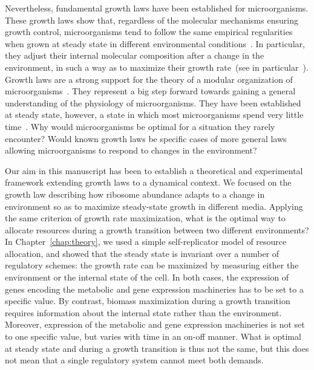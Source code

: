 Nevertheless, fundamental growth laws have been established for microorganisms.
These growth laws show that, regardless of the molecular mechanisms ensuring growth control, microorganisms tend to follow the same empirical regularities when grown at steady state in different environmental conditions~\cite{molenaar_shifts_2009,scott_emergence_2014,scott_interdependence_2010,scott_bacterial_2011}.
In particular, they adjust their internal molecular composition after a change in the environment, in such a way as to maximize their growth rate~(see in particular~\cite{molenaar_shifts_2009,scott_emergence_2014}).
Growth laws are a strong support for the theory of a modular organization of microorganisms~\cite{scott_emergence_2014,hartwell_molecular_1999,arkin_fast_2006,guido_bottom-up_2006}.
They represent a big step forward towards gaining a general understanding of the physiology of microorganisms.
They have been established at steady state, however, a state in which most microorganisms spend very little time~\cite{mcarthur_microbial_2006,menge_nitrogen_2012,
hobbie_microbes_2013,savageau_escherichia_1983,
savageau_demand_1998,blount_unexhausted_2015,vanelsas_survival_2011}.
Why would microorganisms be optimal for a situation they rarely encounter?
Would known growth laws be specific cases of more general laws allowing microorganisms to respond to changes in the environment?

Our aim in this manuscript has been to establish a theoretical and experimental framework extending growth laws to a dynamical context.
We focused on the growth law describing how ribosome abundance adapts to a change in environment so as to maximize steady-state growth in different media.
Applying the same criterion of growth rate maximization, what is the optimal way to allocate resources during a growth transition between two different environments?
In Chapter~\ref{chap:theory}, we used a simple self-replicator model of resource allocation, and showed that the steady state is invariant over a number of regulatory schemes: the growth rate can be maximized by measuring either the environment or the internal state of the cell.
In both cases, the expression of genes encoding the metabolic and gene expression machineries has to be set to a specific value.
By contrast, biomass maximization during a growth transition requires information about the internal state rather than the environment.
Moreover, expression of the metabolic and gene expression machineries is not set to one specific value, but varies with time in an on-off manner.
What is optimal at steady state and during a growth transition is thus not the same, but this does not mean that a single regulatory system cannot meet both demands.


